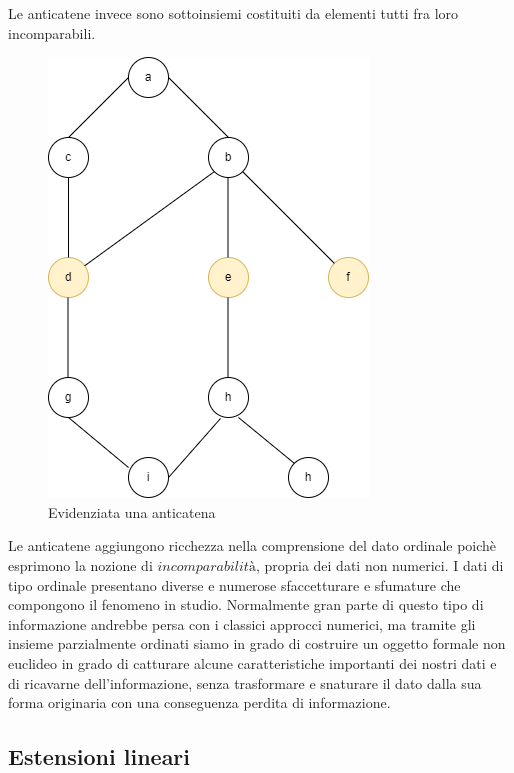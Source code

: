 \documentclass[12pt]{article}
\begin{document}
Le anticatene invece sono sottoinsiemi costituiti da elementi tutti fra loro incomparabili. \\
\begin{figure}[H]
    \centering
    \includegraphics[scale=.5]{ant_catena.png}
    \caption{Evidenziata una anticatena}
\end{figure}

Le anticatene aggiungono ricchezza nella comprensione del dato ordinale poichè esprimono la nozione di $\textit{incomparabilità}$, propria 
dei dati non numerici. I dati di tipo ordinale presentano diverse e numerose sfaccetturare e sfumature che compongono il fenomeno in studio. 
Normalmente gran parte di questo tipo di informazione andrebbe persa con i classici approcci numerici, ma tramite gli insieme parzialmente 
ordinati siamo in grado di costruire un oggetto formale non euclideo in grado di catturare alcune caratteristiche importanti 
dei nostri dati e di ricavarne dell'informazione, senza trasformare e snaturare il dato dalla sua forma originaria con una conseguenza 
perdita di informazione.\\

\subsection{Estensioni lineari}
\end{document}
